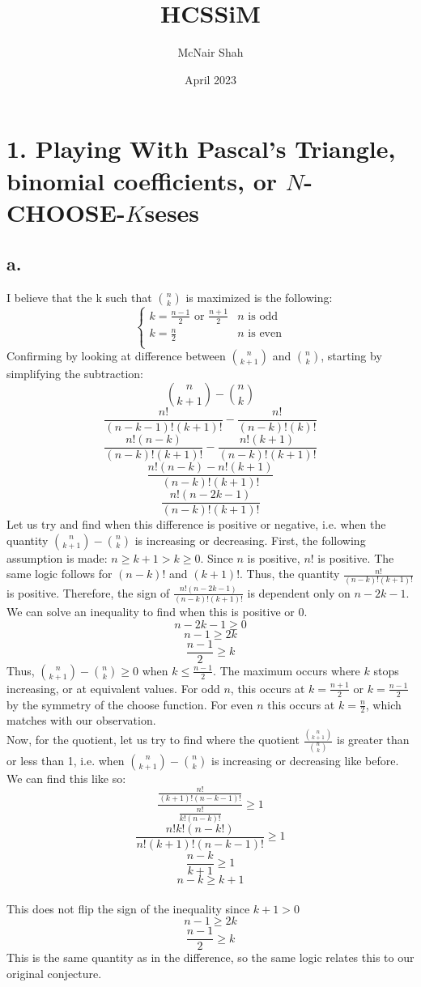 \documentclass{article}
\title{HCSSiM}
\author{McNair Shah}
\date{April 2023}
\begin{document}
\maketitle

\section*{1. Playing With Pascal's Triangle, binomial coefficients, or $N$-CHOOSE-$K$seses}
\subsection*{a.}
I believe that the k such that $n \choose k$ is maximized is the following:
\[\begin{cases}
k=\frac{n-1}{2} \text{ or } \frac{n+1}{2} & n \text{ is odd} \\
k=\frac{n}{2} & n \text{ is even} \\
\end{cases}\]
Confirming by looking at difference between $n \choose k+1$ and $n \choose k$, starting by simplifying the subtraction:
$${n \choose k+1}-{n \choose k}$$
$$\frac{n!}{(n-k-1)!(k+1)!}-\frac{n!}{(n-k)!(k)!}$$
$$\frac{n!(n-k)}{(n-k)!(k+1)!}-\frac{n!(k+1)}{(n-k)!(k+1)!}$$
$$\frac{n!(n-k)-n!(k+1)}{(n-k)!(k+1)!}$$
$$\frac{n!(n-2k-1)}{(n-k)!(k+1)!}$$
Let us try and find when this difference is positive or negative, i.e. when the quantity ${n \choose k+1}-{n \choose k}$ is increasing or decreasing. First, the following assumption is made: $n\geq k+1>k\geq 0$. Since $n$ is positive, $n!$ is positive. The same logic follows for $(n-k)!$ and $(k+1)!$. Thus, the quantity $\frac{n!}{(n-k)!(k+1)!}$ is positive. Therefore, the sign of $\frac{n!(n-2k-1)}{(n-k)!(k+1)!}$ is dependent only on $n-2k-1$. We can solve an inequality to find when this is positive or 0.
$$n-2k-1 \geq 0$$
$$n-1 \geq 2k$$
$$\frac{n-1}{2} \geq k$$
Thus, ${n \choose k+1}-{n \choose k}\geq 0$ when $k \leq \frac{n-1}{2}$. The maximum occurs where $k$ stops increasing, or at equivalent values. For odd $n$, this occurs at $k=\frac{n+1}{2}$ or $k=\frac{n-1}{2}$ by the symmetry of the choose function. For even $n$ this occurs at $k=\frac{n}{2}$, which matches with our observation.
\\Now, for the quotient, let us try to find where the quotient $\frac{{n \choose k+1}}{{n \choose k}}$ is greater than or less than 1, i.e. when ${n \choose k+1}-{n \choose k}$ is increasing or decreasing like before. We can find this like so:
$$\frac{\frac{n!}{(k+1)!(n-k-1)!}}{\frac{n!}{k!(n-k)!}}\geq 1$$
$$\frac{n!k!(n-k!)}{n!(k+1)!(n-k-1)!}\geq 1$$
$$\frac{n-k}{k+1}\geq 1$$
$$n-k\geq k+1$$
\\This does not flip the sign of the inequality since $k+1>0$
$$n-1\geq 2k$$
$$\frac{n-1}{2}\geq k$$
This is the same quantity as in the difference, so the same logic relates this to our original conjecture.
\end{document}
